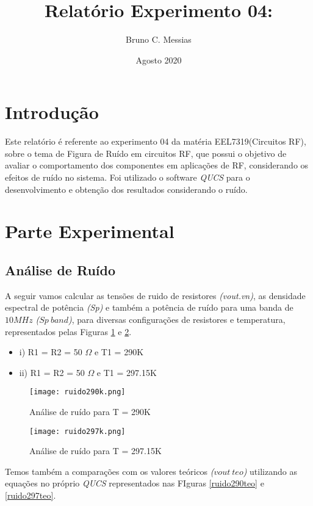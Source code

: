 \documentclass[a4paper,12pt]{proc}
\title{Relatório Experimento 04:}
\author{Bruno C. Messias}
\date{Agosto 2020}
\begin{document}
\maketitle

\section{Introdução}

Este relatório é referente ao experimento 04 da matéria EEL7319(Circuitos RF), sobre o tema de Figura de Ruído em circuitos RF, que possui o objetivo de avaliar o comportamento dos componentes em aplicações de RF, considerando os efeitos de ruído no sistema.
Foi utilizado o software \textit{QUCS} para o desenvolvimento e obtenção dos resultados considerando o ruído.

\section{Parte Experimental}

\subsection{Análise de Ruído}
A seguir vamos calcular as tensões de ruido de resistores \textit{(vout.vn)}, as densidade espectral de potência \textit{(Sp)} e também a potência de ruído para uma banda de $10MHz$ \textit{($Sp~band$)}, para diversas configurações de resistores e temperatura, representados pelas Figuras \ref{ruido290} e \ref{ruido297}.
\begin{itemize}
    \item i) R1 = R2 = 50 $\Omega$ e T1 = 290K
    \item ii) R1 = R2 = 50 $\Omega$ e T1 = 297.15K
\end{itemize}

\begin{figure}[htbp]
    \centering
    \texttt{[image: ruido290k.png]}
    \caption{Análise de ruído para T = 290K}
    \label{ruido290}
\end{figure}

\begin{figure}[htbp]
    \centering
    \texttt{[image: ruido297k.png]}
    \caption{Análise de ruído para T = 297.15K}
    \label{ruido297}
\end{figure}

\noindent Temos também a comparações com os valores teóricos \textit{($vout~teo$)} utilizando as equações no próprio \textit{QUCS} representados nas FIguras \ref{ruido290teo} e \ref{ruido297teo}.
\end{document}
